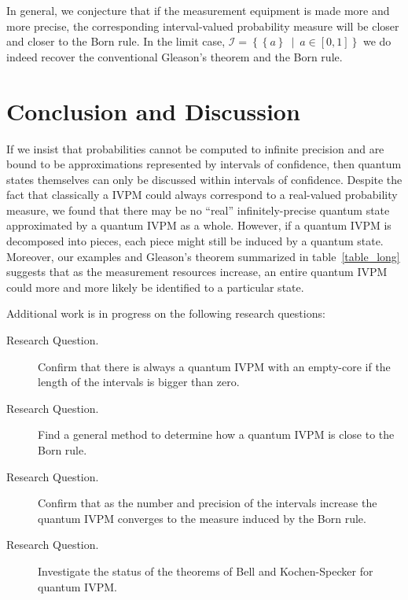 \documentclass{article}
\theoremstyle{remark}
\newcommand{\set}[2]{\ensuremath{\left\{ {#1}~\middle|~{#2}\right\} }}
\begin{document}
In general, we conjecture that if the measurement equipment is made
more and more precise, the corresponding interval-valued probability
measure will be closer and closer to the Born rule. In the limit case,
$\mathscr{I}=\set{\left\{ a\right\} }{a\in\left[0,1\right]}$ we do
indeed recover the conventional Gleason's theorem and the Born rule.

\section{Conclusion and Discussion}

If we insist that probabilities cannot be computed to infinite precision
and are bound to be approximations represented by intervals of confidence,
then quantum states themselves can only be discussed within intervals
of confidence. Despite the fact that classically a IVPM could always
correspond to a real-valued probability measure, we found that there
may be no ``real'' infinitely-precise quantum state approximated
by a quantum IVPM as a whole. However, if a quantum IVPM is decomposed
into pieces, each piece might still be induced by a quantum state.
Moreover, our examples and Gleason's theorem summarized in table~\ref{table_long}
suggests that as the measurement resources increase, an entire quantum
IVPM could more and more likely be identified to a particular state.
\begin{table}[ht]
\caption{Relation between measurement resources and interval-valued probability
measures}
\label{table_long}
\end{table}
Additional work is in progress on the following research questions:
\begin{description}
\item [{Research Question.}] Confirm that there is always a quantum IVPM
with an empty-core if the length of the intervals is bigger than zero. 
\item [{Research Question.}] Find a general method to determine how a
quantum IVPM is close to the Born rule. 
\item [{Research Question.}] Confirm that as the number and precision
of the intervals increase the quantum IVPM converges to the measure
induced by the Born rule. 
\item [{Research Question.}] Investigate the status of the theorems of
Bell and Kochen-Specker for quantum IVPM.
\end{description}
\end{document}
